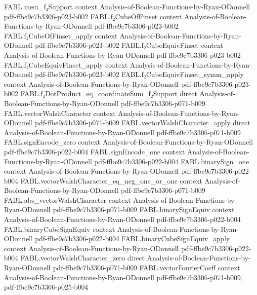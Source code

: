 \begin{theorem}
\proofstep
  {FABL.mem_f₂Support}
  {context}
  {Analysis-of-Boolean-Functions-by-Ryan-ODonnell}
  {pdf-ffbe9c7b3306-p023-b002}
\proofstep
  {FABL.f₂CubeOfFinset}
  {context}
  {Analysis-of-Boolean-Functions-by-Ryan-ODonnell}
  {pdf-ffbe9c7b3306-p023-b002}
\proofstep
  {FABL.f₂CubeOfFinset_apply}
  {context}
  {Analysis-of-Boolean-Functions-by-Ryan-ODonnell}
  {pdf-ffbe9c7b3306-p023-b002}
\proofstep
  {FABL.f₂CubeEquivFinset}
  {context}
  {Analysis-of-Boolean-Functions-by-Ryan-ODonnell}
  {pdf-ffbe9c7b3306-p023-b002}
\proofstep
  {FABL.f₂CubeEquivFinset_apply}
  {context}
  {Analysis-of-Boolean-Functions-by-Ryan-ODonnell}
  {pdf-ffbe9c7b3306-p023-b002}
\proofstep
  {FABL.f₂CubeEquivFinset_symm_apply}
  {context}
  {Analysis-of-Boolean-Functions-by-Ryan-ODonnell}
  {pdf-ffbe9c7b3306-p023-b002}
\proofstep
  {FABL.f₂DotProduct_eq_coordinateSum_f₂Support}
  {direct}
  {Analysis-of-Boolean-Functions-by-Ryan-ODonnell}
  {pdf-ffbe9c7b3306-p071-b009}
\proofstep
  {FABL.vectorWalshCharacter}
  {context}
  {Analysis-of-Boolean-Functions-by-Ryan-ODonnell}
  {pdf-ffbe9c7b3306-p071-b009}
\proofstep
  {FABL.vectorWalshCharacter_apply}
  {direct}
  {Analysis-of-Boolean-Functions-by-Ryan-ODonnell}
  {pdf-ffbe9c7b3306-p071-b009}
\proofstep
  {FABL.signEncode_zero}
  {context}
  {Analysis-of-Boolean-Functions-by-Ryan-ODonnell}
  {pdf-ffbe9c7b3306-p022-b004}
\proofstep
  {FABL.signEncode_one}
  {context}
  {Analysis-of-Boolean-Functions-by-Ryan-ODonnell}
  {pdf-ffbe9c7b3306-p022-b004}
\proofstep
  {FABL.binarySign_one}
  {context}
  {Analysis-of-Boolean-Functions-by-Ryan-ODonnell}
  {pdf-ffbe9c7b3306-p022-b004}
\proofstep
  {FABL.vectorWalshCharacter_eq_neg_one_or_one}
  {context}
  {Analysis-of-Boolean-Functions-by-Ryan-ODonnell}
  {pdf-ffbe9c7b3306-p071-b009}
\proofstep
  {FABL.abs_vectorWalshCharacter}
  {context}
  {Analysis-of-Boolean-Functions-by-Ryan-ODonnell}
  {pdf-ffbe9c7b3306-p071-b009}
\proofstep
  {FABL.binarySignEquiv}
  {context}
  {Analysis-of-Boolean-Functions-by-Ryan-ODonnell}
  {pdf-ffbe9c7b3306-p022-b004}
\proofstep
  {FABL.binaryCubeSignEquiv}
  {context}
  {Analysis-of-Boolean-Functions-by-Ryan-ODonnell}
  {pdf-ffbe9c7b3306-p022-b004}
\proofstep
  {FABL.binaryCubeSignEquiv_apply}
  {context}
  {Analysis-of-Boolean-Functions-by-Ryan-ODonnell}
  {pdf-ffbe9c7b3306-p022-b004}
\proofstep
  {FABL.vectorWalshCharacter_zero}
  {direct}
  {Analysis-of-Boolean-Functions-by-Ryan-ODonnell}
  {pdf-ffbe9c7b3306-p071-b009}
\proofstep
  {FABL.vectorFourierCoeff}
  {context}
  {Analysis-of-Boolean-Functions-by-Ryan-ODonnell}
  {pdf-ffbe9c7b3306-p071-b009,
    pdf-ffbe9c7b3306-p025-b004}

\end{theorem}

